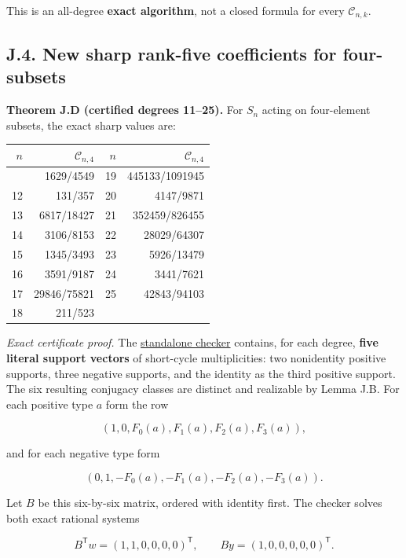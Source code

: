 \documentclass[
  11pt,
]{article}
\begin{document}
This is an all-degree \textbf{exact algorithm}, not a closed formula for
every \(\mathcal C_{n,k}\).

\subsection{J.4. New sharp rank-five coefficients for
four-subsets}\label{j.4.-new-sharp-rank-five-coefficients-for-four-subsets}

\textbf{Theorem J.D (certified degrees 11--25).} For \(S_n\) acting on
four-element subsets, the exact sharp values are:

\begin{longtable}[]{@{}rrrr@{}}
\toprule\noalign{}
\(n\) & \(\mathcal C_{n,4}\) & \(n\) & \(\mathcal C_{n,4}\) \\
\midrule\noalign{}
\endhead
\bottomrule\noalign{}
\endlastfoot
11 & 1629/4549 & 19 & 445133/1091945 \\
12 & 131/357 & 20 & 4147/9871 \\
13 & 6817/18427 & 21 & 352459/826455 \\
14 & 3106/8153 & 22 & 28029/64307 \\
15 & 1345/3493 & 23 & 5926/13479 \\
16 & 3591/9187 & 24 & 3441/7621 \\
17 & 29846/75821 & 25 & 42843/94103 \\
18 & 211/523 & & \\
\end{longtable}

\emph{Exact certificate proof.} The
\href{../../notes/johnson-short-cycle-spectrum/check_k4.py}{standalone
checker} contains, for each degree, \textbf{five literal support
vectors} of short-cycle multiplicities: two nonidentity positive
supports, three negative supports, and the identity as the third
positive support. The six resulting conjugacy classes are distinct and
realizable by Lemma J.B. For each positive type \(a\) form the row

\[
(1,0,F_0(a),F_1(a),F_2(a),F_3(a)),
\]

and for each negative type form

\[
(0,1,-F_0(a),-F_1(a),-F_2(a),-F_3(a)).
\]

Let \(B\) be this six-by-six matrix, ordered with identity first. The
checker solves both exact rational systems

\[
B^{\mathsf T}w=(1,1,0,0,0,0)^{\mathsf T},
\qquad
By=(1,0,0,0,0,0)^{\mathsf T}. \tag{J.8}
\]
\end{document}
